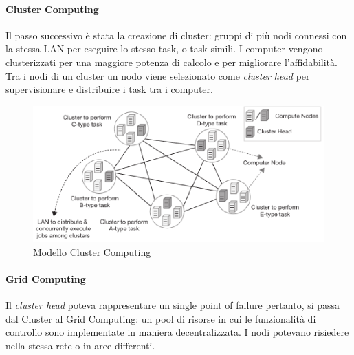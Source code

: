 \documentclass{article}
\begin{document}
\paragraph{Cluster Computing}
Il passo successivo è stata la creazione di cluster: gruppi di più nodi connessi con la stessa LAN per eseguire lo stesso task, o task simili. I computer vengono clusterizzati per una maggiore potenza di calcolo e per migliorare l’affidabilità. Tra i nodi di un cluster un nodo viene selezionato come \textit{cluster head} per supervisionare e distribuire i task tra i computer.
\begin{figure}[H]
    \centering
    \includegraphics[scale=1]{img/cluster.png}
    \caption{Modello Cluster Computing}
\end{figure}

\paragraph{Grid Computing}
Il \textit{cluster head} poteva rappresentare un single point of failure pertanto, si passa dal Cluster al Grid Computing: un pool di risorse in cui le funzionalità di controllo sono implementate in maniera decentralizzata. I nodi potevano risiedere nella stessa rete o in aree differenti.
\end{document}
